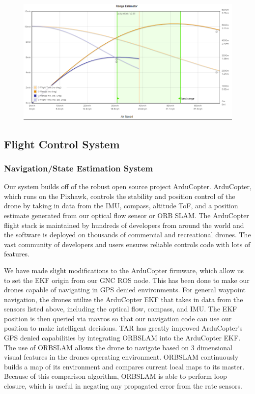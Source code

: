 \documentclass[12pt,letterpaper]{article}
\begin{document}
		\begin{figure}[!htbp]
			\begin{center}
				\includegraphics[width=\textwidth]{powerGraph}
			\end{center}
		\end{figure}

\pagebreak

	\subsection*{Flight Control System}
		\subsubsection*{Navigation/State Estimation System}

			Our system builds off of the robust open source project ArduCopter. ArduCopter, which runs on the Pixhawk, controls the stability and position control of the drone by taking in data from the IMU, compass, altitude ToF, and a position estimate generated from our optical flow sensor or ORB SLAM. The ArduCopter flight stack is maintained by hundreds of developers from around the world and the software is deployed on thousands of commercial and recreational drones. The vast community of developers and users ensures reliable controls code with lots of features.

			We have made slight modifications to the ArduCopter firmware, which allow us to set the EKF origin from our GNC ROS node. This has been done to make our drones capable of navigating in GPS denied environments. For general waypoint navigation, the drones utilize the ArduCopter EKF that takes in data from the sensors listed above, including the optical flow, compass, and IMU. The EKF position is then queried via mavros so that our navigation code can use our position to make intelligent decisions. TAR has greatly improved ArduCopter’s GPS denied capabilities by integrating ORBSLAM into the ArduCopter EKF. The use of ORBSLAM allows the drone to navigate based on 3 dimensional visual features in the drones operating environment. ORBSLAM continuously builds a map of its environment and compares current local maps to its master. Because of this comparison algorithm, ORBSLAM is able to perform loop closure, which is useful in negating any propagated error from the rate sensors.
\end{document}
